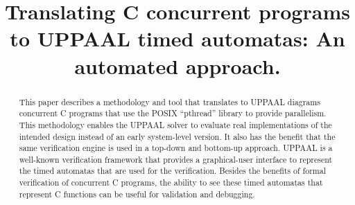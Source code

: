 \documentclass[conference]{IEEEtran}
\begin{document}
\title{Translating C concurrent programs to UPPAAL timed automatas: An automated approach.}

\author{\IEEEauthorblockN{}
\IEEEauthorblockA{\\
\\
\\
}
}

\maketitle

\begin{abstract}
This paper describes a methodology and tool that translates to UPPAAL diagrams concurrent C programs that use the POSIX ``pthread'' library to provide parallelism. This  methodology enables the UPPAAL solver to evaluate real implementations of  the  intended  design  instead  of  an  early  system-level version. It also has the benefit that the same verification engine is used in a top-down and bottom-up approach. UPPAAL is a well-known verification framework that provides a graphical-user interface to represent the timed automatas that are used for the verification. Besides the benefits of formal verification of concurrent C programs, the ability to see these timed automatas that represent C functions can be useful for validation and debugging.
\end{abstract}

\IEEEpeerreviewmaketitle
\end{document}
